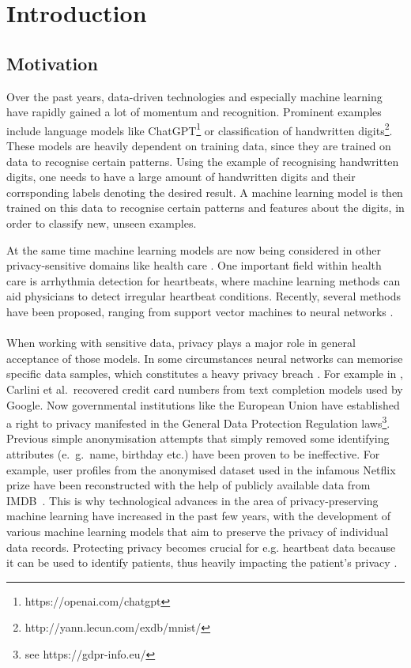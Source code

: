 \section{Introduction}

\subsection{Motivation}
Over the past years, data-driven technologies and especially machine learning have rapidly gained a lot of momentum and recognition. Prominent examples include language models like ChatGPT\footnote{https://openai.com/chatgpt} or classification of handwritten digits\footnote{http://yann.lecun.com/exdb/mnist/}. These models are heavily dependent on training data, since they are trained on data to recognise certain patterns. Using the example of recognising handwritten digits, one needs to have a large amount of handwritten digits and their corrsponding labels denoting the desired result. A machine learning model is then trained on this data to recognise certain patterns and features about the digits, in order to classify new, unseen examples.


At the same time machine learning models are now being considered in other privacy-sensitive domains like health care \parencite[see][]{ai_and_med,aimed2,aimed3,aimed4}. One important field within health care is arrhythmia detection for heartbeats, where machine learning methods can aid physicians to detect irregular heartbeat conditions. Recently, several methods have been proposed, ranging from support vector machines to neural networks \parencite[see review][]{arr_rev}.

\paragraph{}
When working with sensitive data, privacy plays a major role in general acceptance of those models. In some circumstances neural networks can memorise specific data samples, which constitutes a heavy privacy breach \Parencite[see][]{feldman2021does}. For example in \Parencite{carlini19}, Carlini et al.\ recovered credit card numbers from text completion models used by Google. Now governmental institutions like the European Union have established a right to privacy manifested in the General Data Protection Regulation laws\footnote[1]{see https://gdpr-info.eu/}. Previous simple anonymisation attempts that simply removed some identifying attributes (e.\ g.\ name, birthday etc.) have been proven to be ineffective. For example, user profiles from the anonymised dataset used in the infamous Netflix prize have been reconstructed with the help of publicly available data from IMDB~\cite{4531148}. This is why technological advances in the area of privacy-preserving machine learning have increased in the past few years, with the development of various machine learning models that aim to preserve the privacy of individual data records. Protecting privacy becomes crucial for e.g. heartbeat data because it can be used to identify patients, thus heavily impacting the patient's privacy \parencite[see heartbeat biometrics][]{heartb_auth,hegde2011heartbeat}.

